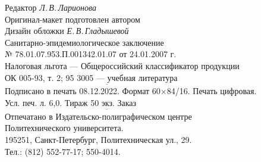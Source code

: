 \documentclass[a5paper,openany]{book}
\newcommand{\ov}{\overline}
\begin{document}
\begin{center}
	Редактор \emph{Л.\,В.\,Ларионова} \\
	Оригинал-макет подготовлен автором\\
	Дизайн обложки \emph{Е.\,В.\,Гладышевой}\\
	\hfill \break	
	Санитарно-эпидемиологическое заключение\\
	№ 78.01.07.953.П.001342.01.07 от 24.01.2007 г. \\
	\hfill \break	
	Налоговая льгота --- Общероссийский классификатор продукции \\
	ОК 005-93, т. 2; 95 3005 --- учебная литература\\
	$\ov{~~~~~~~~~~~~~~~~~~~~~~~~~~~~~~~~~~~~~~~~~~~~~~~~~~~~~~~~~~~~~~~~~~~~~~~~~~~~~~~~~~~~~~~~~~~~~~~~~~~~~~~~~~~~~~~}$\\
	Подписано в печать 08.12.2022. Формат 60$\times$84/16. Печать цифровая. \\
	Усл. печ. л. 6,0. Тираж 50 экз. Заказ ~~~~ \\
	$\ov{~~~~~~~~~~~~~~~~~~~~~~~~~~~~~~~~~~~~~~~~~~~~~~~~~~~~~~~~~~~~~~~~~~~~~~~~~~~~~~~~~~~~~~~~~~~~~~~~~~~~~~~~~~~~~~~}$\\ 
	Отпечатано в Издательско-полиграфическом центре \\
	Политехнического университета. \\
	195251, Санкт-Петербург, Политехническая ул., 29. \\
	Тел.: (812) 552-77-17; 550-4014.
	
\end{center}



\thispagestyle{empty} %
\end{document}
